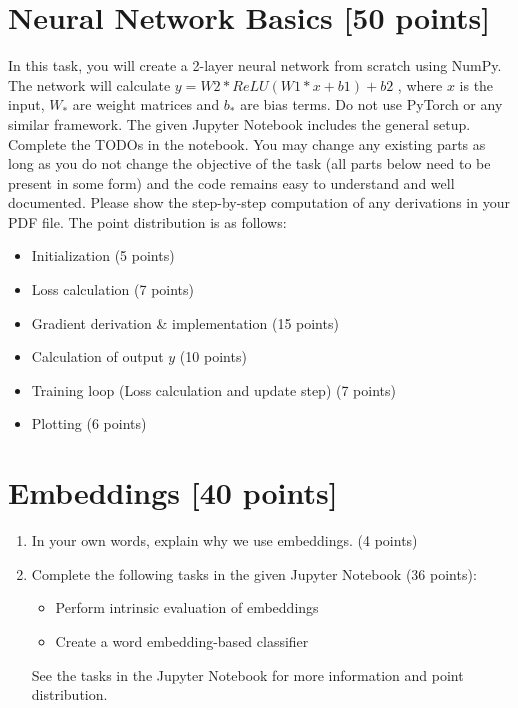\documentclass[a4paper,11pt]{article}
\theoremstyle{mytheor}
\begin{document}
\section{Neural Network Basics [50 points]}
In this task, you will create a 2-layer neural network from scratch using NumPy. The network will calculate $y = W2 * ReLU (W1 * x + b1 ) + b2$ , where $x$ is the input, $W_*$ are weight matrices and $b_*$ are bias terms. Do not use PyTorch or any similar framework. The given Jupyter Notebook includes the general setup. Complete the TODOs in the notebook. You may change any existing parts as long as you do not change the objective of the task (all parts below need to be present in some form) and the code remains easy to understand and well documented. Please show the step-by-step computation of any derivations in your PDF file.
The point distribution is as follows:
\begin{itemize}
    \item Initialization (5 points)
    \item Loss calculation (7 points)
    \item Gradient derivation \& implementation (15 points)
    \item Calculation of output $y$ (10 points)
    \item Training loop (Loss calculation and update step) (7 points)
    \item Plotting (6 points)
\end{itemize}


\section{Embeddings [40 points]}
\begin{enumerate}
    \item In your own words, explain why we use embeddings. (4 points)
    \item Complete the following tasks in the given Jupyter Notebook (36 points):
    \begin{itemize}
        \item Perform intrinsic evaluation of embeddings
        \item Create a word embedding-based classifier
    \end{itemize}
    See the tasks in the Jupyter Notebook for more information and point distribution.
\end{enumerate}
\end{document}
